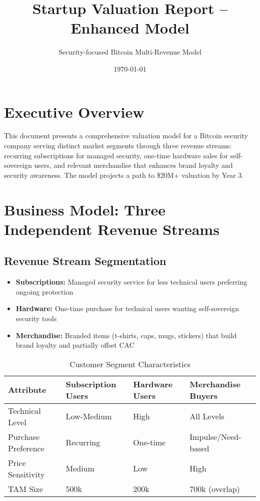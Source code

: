 \documentclass[11pt]{article}
\begin{document}
\title{Startup Valuation Report -- Enhanced Model}
\author{Security-focused Bitcoin Multi-Revenue Model}
\date{\today}
\maketitle

\section*{Executive Overview}
This document presents a comprehensive valuation model for a Bitcoin security company serving distinct market segments through three revenue streams: recurring subscriptions for managed security, one-time hardware sales for self-sovereign users, and relevant merchandise that enhances brand loyalty and security awareness. The model projects a path to \$20M+ valuation by Year 3.

\section{Business Model: Three Independent Revenue Streams}

\subsection{Revenue Stream Segmentation}
\begin{itemize}
  \item \textbf{Subscriptions:} Managed security service for less technical users preferring ongoing protection
  \item \textbf{Hardware:} One-time purchase for technical users wanting self-sovereign security tools
  \item \textbf{Merchandise:} Branded items (t-shirts, caps, mugs, stickers) that build brand loyalty and partially offset CAC
\end{itemize}

\begin{table}[H]
\centering
\caption{Customer Segment Characteristics}
\begin{tabularx}{\linewidth}{l X X X}
\toprule
Attribute & Subscription Users & Hardware Users & Merchandise Buyers \\\midrule
Technical Level & Low-Medium & High & All Levels \\
Purchase Preference & Recurring & One-time & Impulse/Need-based \\
Price Sensitivity & Medium & Low & High \\
TAM Size & 500k & 200k & 700k (overlap) \\
\bottomrule
\end{tabularx}
\end{table}
\end{document}
